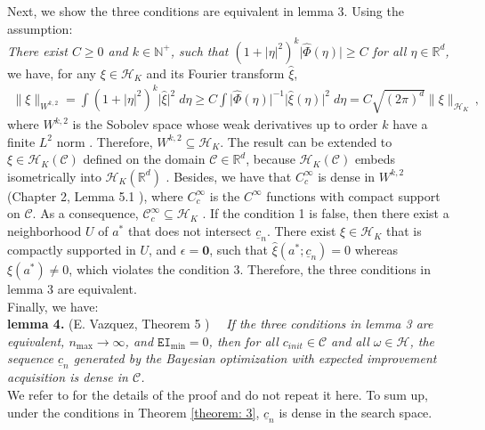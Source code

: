 Next, we show the three conditions are equivalent in lemma 3. Using the assumption:\\
\emph{
There exist $C\ge 0$ and $k \in\mathbb{N}^+$, such that
$(1+|\eta|^2)^k \big|\hat{\Phi}(\eta)\big|\ge C$ for all $\eta\in \mathbb{R}^d$,}\\
we have,
for any $\xi\in \mathcal{H}_K$ and its Fourier transform $\hat{\xi}$, 
\begin{equation*}\begin{split}
    \big\|\xi\big\|_{W^{k,2}} = 
    \int (1+|\eta|^2)^k \big| \hat{\xi} \big|^2 \; d\eta 
    \ge C \int \big|\hat{\Phi}(\eta)\big|^{-1} \big|\hat{\xi}(\eta)\big|^2 \; d\eta
    = C \sqrt{(2\pi)^d} \big\|\xi\big\|_{\mathcal{H}_K}\,,
\end{split}
\label{space equal}
\end{equation*}
where $W^{k,2}$ is the Sobolev space whose weak derivatives up to order $k$ 
have a finite $L^2$ norm
\cite{converge Bull}. Therefore, $W^{k,2}\subseteq \mathcal{H}_K$.
The result can be extended to $\xi \in \mathcal{H}_K(\mathcal{C})$ defined on the domain 
$\mathcal{C}\in \mathbb{R}^d$, because $\mathcal{H}_K(\mathcal{C})$ embeds isometrically
into $\mathcal{H}_K(\mathbb{R}^d)$ \cite{RKHS aronszajn}. Besides, we have that
$C_c^\infty$ is dense in $W^{k,2}$ (Chapter 2, Lemma 5.1 \cite{Hilbert space Showalter Book}),
where $C_c^\infty$ is the $C^\infty$ functions with compact support on $\mathcal{C}$.
As a consequence, $\mathcal{C}^\infty_c\subseteq \mathcal{H}_K$ \cite{convergen EI}.
If the condition 1 is false, 
then there exist a neighborhood
$U$ of $a^*$ that does not intersect $\underline{c}_n$. There exist $\xi\in \mathcal{H}_K$ 
that is compactly supported in $U$,
and $\epsilon = \textbf{0}$,
such that $\hat{\xi}(a^*; \underline{c}_n) = 0$ whereas
$\xi(a^*) \neq 0$, which violates the condition 3.
Therefore, the three conditions in lemma 3 are equivalent.\\

Finally, we have:\\
\textbf{lemma 4.} (E. Vazquez, Theorem 5 \cite{convergen EI})$\quad$ 
\emph{If the three conditions in
lemma 3 are equivalent, $n_{\max}\rightarrow \infty$, and $\texttt{EI}_{\min}=0$,
then for all $c_{init}\in \mathcal{C}$ and all $\omega \in \mathcal{H}$, the sequence 
$\underline{c}_n$ generated by the Bayesian optimization with expected improvement acquisition 
is dense in $\mathcal{C}$.
}\\
We refer to \cite{convergen EI} for the details of the proof and do not repeat it here. 
To sum up, under the conditions in Theorem 
\ref{theorem: 3}, $\underline{c}_n$ is dense in the search space.
\hfill\qedsymbol



